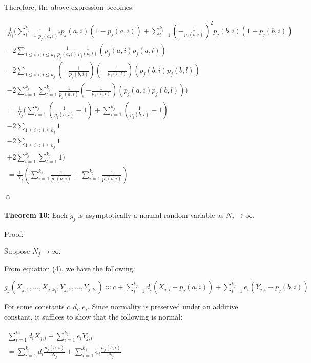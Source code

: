 \documentclass{article}
\begin{document}
Therefore, the above expression becomes:

$\displaystyle  \begin{array}{l}
\frac{1}{N_{j}}(\sum _{i=1}^{k_{j}}\frac{1}{p_{j}( a,i)^{2}} p_{j}( a,i)( 1-p_{j}( a,i)) +\sum _{i=1}^{k_{j}}\left( -\frac{1}{p_{j}( b,i)}\right)^{2} p_{j}( b,i)( 1-p_{j}( b,i))\\
-2\sum _{1\leqslant i< l\leqslant k_{j}}\frac{1}{p_{j}( a,i)}\frac{1}{p_{j}( a,l)}( p_{j}( a,i) p_{j}( a,l))\\
-2\sum _{1\leqslant i< l\leqslant k_{j}}\left( -\frac{1}{p_{j}( b,i)}\right)\left( -\frac{1}{p_{j}( b,l)}\right)( p_{j}( b,i) p_{j}( b,l))\\
-2\sum _{i=1}^{k_{j}}\sum _{l=1}^{k_{j}}\frac{1}{p_{j}( a,i)}\left( -\frac{1}{p_{j}( b,l)}\right)( p_{j}( a,i) p_{j}( b,l)))\\
=\frac{1}{N_{j}}(\sum _{i=1}^{k_{j}}\left(\frac{1}{p_{j}( a,i)} -1\right) +\sum _{i=1}^{k_{j}}\left(\frac{1}{p_{j}( b,i)} -1\right)\\
-2\sum _{1\leqslant i< l\leqslant k_{j}} 1\\
-2\sum _{1\leqslant i< l\leqslant k_{j}} 1\\
+2\sum _{i=1}^{k_{j}}\sum _{l=1}^{k_{j}} 1)\\
=\frac{1}{N_{j}}\left(\sum _{i=1}^{k_{j}}\frac{1}{p_{j}( a,i)} +\sum _{i=1}^{k_{j}}\frac{1}{p_{j}( b,i)}\right)
\end{array}$

\qed 



\textbf{Theorem 10:} Each $\displaystyle g_{j}$ is asymptotically a normal random variable as $\displaystyle N_{j}\rightarrow \infty $.

Proof:

Suppose $\displaystyle N_{j}\rightarrow \infty $.

From equation (4), we have the following:

$\displaystyle g_{j}\left( X_{j,1} ,...,X_{j,k_{j}} ,Y_{j,1} ,...,Y_{j,k_{j}}\right) \approx c+\sum _{i=1}^{k_{j}} d_{i}\left( X_{j,i} -p_{j}\left( a,i\right)\right) +\sum _{i=1}^{k_{j}} e_{i}\left( Y_{j,i} -p_{j}\left( b,i\right)\right)$

For some constants $\displaystyle c,d_{i} ,e_{i}$. Since normality is preserved under an additive constant, it suffices to show that the following is normal:

$\displaystyle  \begin{array}{l}
\sum _{i=1}^{k_{j}} d_{i} X_{j,i} +\sum _{i=1}^{k_{j}} e_{i} Y_{j,i}\\
=\sum _{i=1}^{k_{j}} d_{i}\frac{n_{j}\left( a,i\right)}{N_{j}} +\sum _{i=1}^{k_{j}} e_{i}\frac{n_{j}\left( b,i\right)}{N_{j}}
\end{array}$
\end{document}
